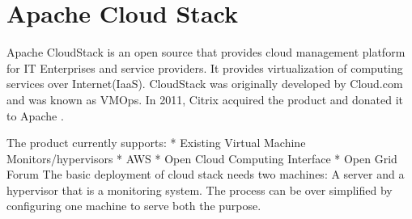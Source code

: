 \section{Apache Cloud Stack}

Apache CloudStack is an open source that provides cloud management platform for IT Enterprises and service providers. 
It provides virtualization of computing services over Internet(IaaS)\cite{ hid-sp18-417-techtarget-cloudStack}. 
CloudStack was originally developed by Cloud.com and was known as VMOps. 
In 2011, Citrix acquired the product and donated it to Apache \cite{ hid-sp18-417-wiki-cloudstack}. 

The product currently supports:
*        Existing Virtual Machine Monitors/hypervisors
*        AWS
*        Open Cloud Computing Interface
*        Open Grid Forum
 The basic deployment of cloud stack needs two machines: A server and a hypervisor that is a monitoring system. 
 The process can be over simplified by configuring one machine to serve both the purpose.\cite{ hid-sp18-417-doc-cloudstack}
